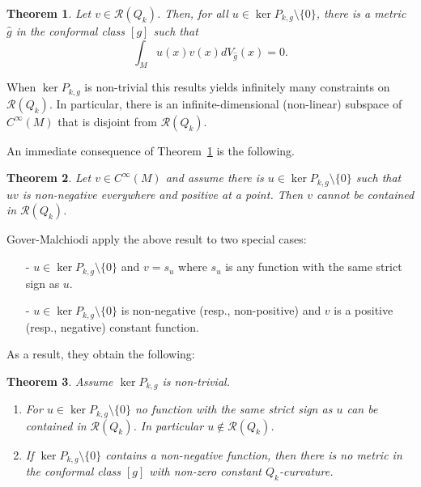 \documentclass{amsart}
\newtheorem{theorem}{Theorem}[section]
\theoremstyle{definition}
\theoremstyle{remark}
\begin{document}
\begin{theorem}\label{prop:vanishing}
    Let $v \in {{\mathcal{R}}}(Q_{k})$. Then, for all $u\in
    \ker P_{k,g}\setminus \{0\}$, there is a metric $\hat{g}$ in the
    conformal class $[g]$ such that
    \begin{equation*}
        \int_{M}u(x)v(x)dV_{\hat{g}}(x)=0.
    \end{equation*}
\end{theorem}

When $\ker P_{k,g}$ is non-trivial this results yields infinitely many
constraints on ${{\mathcal{R}}}(Q_{k})$. In particular, there is an
infinite-dimensional (non-linear) subspace of $C^{\infty}(M)$ that is
disjoint from ${{\mathcal{R}}}(Q_{k})$.
  
An immediate consequence of Theorem~\ref{prop:vanishing} is the following. 

\begin{theorem}
  Let $v \in C^{\infty}(M)$ and assume there is $u\in \ker
  P_{k,g}\setminus \{0\}$ such that $uv$ is non-negative everywhere
  and positive at a point. Then $v$ cannot be contained in
  ${{\mathcal{R}}}(Q_{k})$.
\end{theorem}

Gover-Malchiodi apply the above result to two special cases:
\begin{itemize}
    \item[-] $u\in \ker P_{k,g}\setminus \{0\}$ and $v=s_u$ where
      $s_u$ is any function with the same strict sign as $u$.

    \item[-]  $u\in \ker P_{k,g}\setminus \{0\}$ is non-negative (resp., non-positive) and $v$ is a positive (resp., 
    negative) constant function.  
\end{itemize}
As a result, they obtain the following:

\begin{theorem} Assume $\ker P_{k,g}$ is non-trivial.   
\begin{enumerate}
    \item  
For $u \in \ker P_{k,g}\setminus \{0\}$ no function with the same
strict sign as $u$ can be contained in ${{\mathcal{R}}}(Q_{k})$. In particular
$u\notin {{\mathcal{R}}}(Q_{k})$.

    \item  If $\ker P_{k,g}\setminus \{0\}$ contains a non-negative function, then there is no metric 
     in the conformal class $[g]$ with non-zero constant $Q_{k}$-curvature.
\end{enumerate}
\end{theorem}
\end{document}
